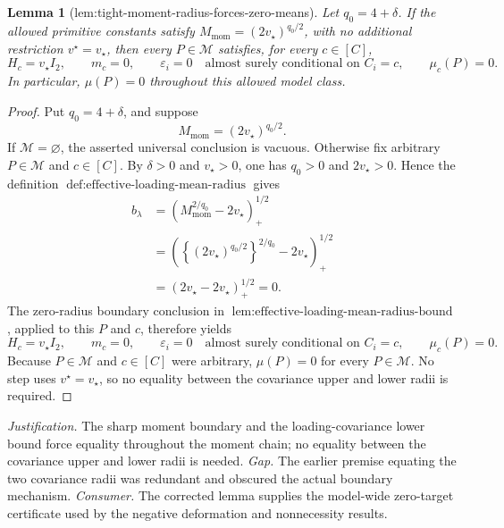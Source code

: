 \documentclass{article}
\newtheorem{lemma}{Lemma}
\begin{document}
\begin{lemma}[lem:tight-moment-radius-forces-zero-means]\label{lem:tight-moment-radius-forces-zero-means}
Let \(q_0=4+\delta\). If the allowed primitive constants satisfy \(M_{\mathrm{mom}}=(2v_\star)^{q_0/2}\), with no additional restriction \(v^{\star}=v_\star\), then every \(P\in\mathcal M\) satisfies, for every \(c\in[C]\),
\[
H_c=v_\star I_2,
\qquad
m_c=0,
\qquad
\varepsilon_i=0\quad\text{almost surely conditional on }C_i=c,
\qquad
\mu_c(P)=0.
\]
In particular, \(\mu(P)=0\) throughout this allowed model class.
\end{lemma}
\begin{proof}
Put \(q_0=4+\delta\), and suppose
\[
M_{\mathrm{mom}}=(2v_\star)^{q_0/2}.
\]
If \(\mathcal M=\varnothing\), the asserted universal conclusion is vacuous. Otherwise fix arbitrary \(P\in\mathcal M\) and \(c\in[C]\). By \(\delta>0\) and \(v_\star>0\), one has \(q_0>0\) and \(2v_\star>0\). Hence the definition \(\operatorname{def:effective\text{-}loading\text{-}mean\text{-}radius}\) gives
\[
\begin{aligned}
b_\lambda
&=\left(M_{\mathrm{mom}}^{2/q_0}-2v_\star\right)_+^{1/2}\\
&=\left(\left\{(2v_\star)^{q_0/2}\right\}^{2/q_0}-2v_\star\right)_+^{1/2}\\
&=\left(2v_\star-2v_\star\right)_+^{1/2}=0.
\end{aligned}
\]
The zero-radius boundary conclusion in \(\operatorname{lem:effective\text{-}loading\text{-}mean\text{-}radius\text{-}bound}\), applied to this \(P\) and \(c\), therefore yields
\[
H_c=v_\star I_2,
\qquad
m_c=0,
\qquad
\varepsilon_i=0\quad\text{almost surely conditional on }C_i=c,
\qquad
\mu_c(P)=0.
\]
Because \(P\in\mathcal M\) and \(c\in[C]\) were arbitrary, \(\mu(P)=0\) for every \(P\in\mathcal M\). No step uses \(v^{\star}=v_\star\), so no equality between the covariance upper and lower radii is required.
\end{proof}
\par\smallskip\noindent \textit{Justification.} The sharp moment boundary and the loading-covariance lower bound force equality throughout the moment chain; no equality between the covariance upper and lower radii is needed. \textit{Gap.} The earlier premise equating the two covariance radii was redundant and obscured the actual boundary mechanism. \textit{Consumer.} The corrected lemma supplies the model-wide zero-target certificate used by the negative deformation and nonnecessity results.
\end{document}
